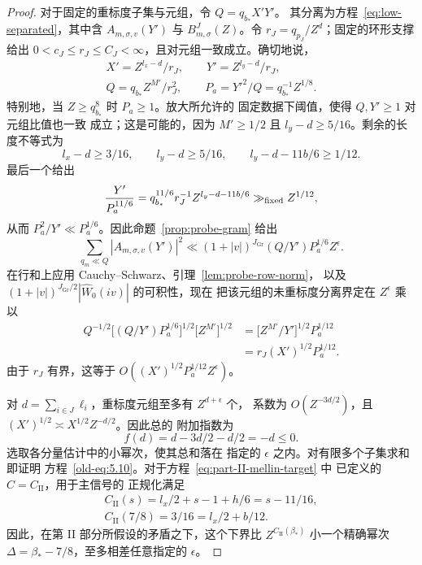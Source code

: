 \begin{proof}
对于固定的重标度子集与元组，令 $Q=q_{b_*}X'Y'$。
其分离为方程~\eqref{eq:low-separated}，其中含
$A_{m,\sigma,v}(Y')$ 与 $B^J_{m,\sigma}(Z)$。令
$r_J=q_{p_J}/Z^d$；固定的环形支撑给出
$0<c_J\le r_J\le C_J<\infty$，且对元组一致成立。确切地说，
\[
 \begin{gathered}
 X'=Z^{l_x-d}/r_J,\qquad Y'=Z^{l_y-d}/r_J,\\
 Q=q_{b_*}Z^{M'}/r_J^2,\qquad
 P_a=Y'^2/Q=q_{b_*}^{-1}Z^{1/8}.
 \end{gathered}
\]
特别地，当 $Z\ge q_{b_*}^8$ 时 $P_a\ge1$。放大所允许的
固定数据下阈值，使得 $Q,Y'\ge1$ 对元组比值也一致
成立；这是可能的，因为 $M'\ge1/2$ 且
$l_y-d\ge5/16$。剩余的长度不等式为
\[
 l_x-d\ge3/16,\qquad l_y-d\ge5/16,
 \qquad l_y-d-11b/6\ge1/12.
\]
最后一个给出
\[
 \frac{Y'}{P_a^{11/6}}
 =q_{b_*}^{11/6}r_J^{-1}Z^{l_y-d-11b/6}
       \gg_{\rm fixed}Z^{1/12},
\]
从而 $P_a^2/Y'\ll P_a^{1/6}$。因此命题~\ref{prop:probe-gram}
给出
\begin{equation}
 \sum_{q_m\ll Q}|A_{m,\sigma,v}(Y')|^2
 \ll (1+|v|)^{J_{\mathrm{Gr}}}(Q/Y')P_a^{1/6}Z^\epsilon.
 \label{old-eq:5.6}
\end{equation}
在行和上应用 Cauchy--Schwarz、引理~\ref{lem:probe-row-norm}，
以及 $(1+|v|)^{J_{\mathrm{Gr}}/2}|\widehat W_0(iv)|$ 的可积性，现在
把该元组的未重标度分离界定在 $Z^\epsilon$ 乘以
\[
 \begin{aligned}
 Q^{-1/2}\bigl[(Q/Y')P_a^{1/6}\bigr]^{1/2}
       \bigl[Z^{M'}\bigr]^{1/2}
 &=\bigl[Z^{M'}/Y'\bigr]^{1/2}P_a^{1/12}\\
 &=r_J(X')^{1/2}P_a^{1/12}.
 \end{aligned}
\]
由于 $r_J$ 有界，这等于
$O((X')^{1/2}P_a^{1/12}Z^\epsilon)$。

对 $d=\sum_{i\in J}\ell_i$，重标度元组至多有 $Z^{d+\epsilon}$ 个，
系数为 $O(Z^{-3d/2})$，且
$(X')^{1/2}\asymp X^{1/2}Z^{-d/2}$。因此总的
附加指数为
\begin{equation}
 f(d)=d-3d/2-d/2=-d\le0.
 \label{old-eq:5.5}
\end{equation}
选取各分量估计中的小幂次，使其总和落在
指定的 $\epsilon$ 之内。对有限多个子集求和即证明
方程~\eqref{old-eq:5.10}。对于方程~\eqref{eq:part-II-mellin-target} 中
已定义的 $C=C_{\mathrm{II}}$，用于主信号的
正规化满足
\begin{equation}
 \begin{gathered}
 C_{\mathrm{II}}(s)=l_x/2+s-1+h/6=s-11/16,\\
 C_{\mathrm{II}}(7/8)=3/16=l_x/2+b/12.
 \end{gathered}
 \label{old-eq:5.11}
\end{equation}
因此，在第 II 部分所假设的矛盾之下，这个下界比
$Z^{C_{\mathrm{II}}(\beta_*)}$ 小一个精确幂次
$\Delta=\beta_*-7/8$，至多相差任意指定的 $\epsilon$。
\end{proof}

